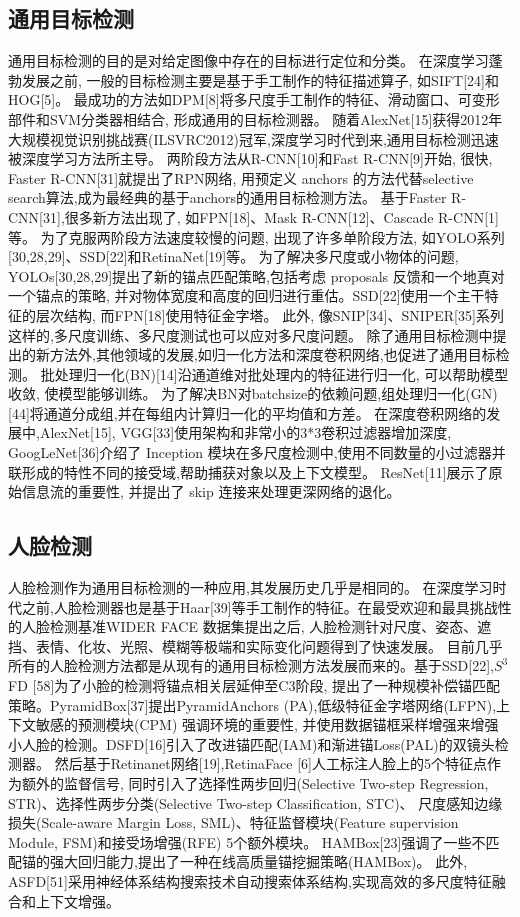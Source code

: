 \documentclass[twocolumn,10pt,a4paper]{article}%
\begin{document}
	\subsection{通用目标检测} 
	通用目标检测的目的是对给定图像中存在的目标进行定位和分类。
	在深度学习蓬勃发展之前, 一般的目标检测主要是基于手工制作的特征描述算子, 如SIFT[24]和HOG[5]。
	最成功的方法如DPM[8]将多尺度手工制作的特征、滑动窗口、可变形部件和SVM分类器相结合, 形成通用的目标检测器。
	随着AlexNet[15]获得2012年大规模视觉识别挑战赛(ILSVRC2012)冠军,深度学习时代到来,通用目标检测迅速被深度学习方法所主导。
	两阶段方法从R-CNN[10]和Fast R-CNN[9]开始,
	很快, Faster R-CNN[31]就提出了RPN网络,
	用预定义 anchors 的方法代替selective search算法,成为最经典的基于anchors的通用目标检测方法。
	基于Faster R-CNN[31],很多新方法出现了, 如FPN[18]、Mask R-CNN[12]、Cascade R-CNN[1]等。
	为了克服两阶段方法速度较慢的问题, 出现了许多单阶段方法, 如YOLO系列[30,28,29]、SSD[22]和RetinaNet[19]等。
	为了解决多尺度或小物体的问题, YOLOs[30,28,29]提出了新的锚点匹配策略,包括考虑 proposals 反馈和一个地真对一个锚点的策略,
	并对物体宽度和高度的回归进行重估。SSD[22]使用一个主干特征的层次结构, 而FPN[18]使用特征金字塔。
	此外, 像SNIP[34]、SNIPER[35]系列这样的,多尺度训练、多尺度测试也可以应对多尺度问题。
	除了通用目标检测中提出的新方法外,其他领域的发展,如归一化方法和深度卷积网络,也促进了通用目标检测。
	批处理归一化(BN)[14]沿通道维对批处理内的特征进行归一化, 可以帮助模型收敛, 使模型能够训练。
	为了解决BN对batchsize的依赖问题,组处理归一化(GN)[44]将通道分成组,并在每组内计算归一化的平均值和方差。
	在深度卷积网络的发展中,AlexNet[15], VGG[33]使用架构和非常小的3*3卷积过滤器增加深度,
	GoogLeNet[36]介绍了 Inception 模块在多尺度检测中,使用不同数量的小过滤器并联形成的特性不同的接受域,帮助捕获对象以及上下文模型。
	ResNet[11]展示了原始信息流的重要性, 并提出了 skip 连接来处理更深网络的退化。
	\subsection{人脸检测}
	人脸检测作为通用目标检测的一种应用,其发展历史几乎是相同的。
	在深度学习时代之前,人脸检测器也是基于Haar[39]等手工制作的特征。在最受欢迎和最具挑战性的人脸检测基准WIDER FACE 数据集提出之后,
	人脸检测针对尺度、姿态、遮挡、表情、化妆、光照、模糊等极端和实际变化问题得到了快速发展。
	目前几乎所有的人脸检测方法都是从现有的通用目标检测方法发展而来的。基于SSD[22],$S^3$FD [58]为了小脸的检测将锚点相关层延伸至C3阶段,
	提出了一种规模补偿锚匹配策略。PyramidBox[37]提出PyramidAnchors (PA),低级特征金字塔网络(LFPN),上下文敏感的预测模块(CPM)
	强调环境的重要性, 并使用数据锚框采样增强来增强小人脸的检测。DSFD[16]引入了改进锚匹配(IAM)和渐进锚Loss(PAL)的双镜头检测器。
	然后基于Retinanet网络[19],RetinaFace [6]人工标注人脸上的5个特征点作为额外的监督信号,
	同时引入了选择性两步回归(Selective Two-step Regression, STR)、选择性两步分类(Selective Two-step Classification, STC)、
	尺度感知边缘损失(Scale-aware Margin Loss, SML)、特征监督模块(Feature supervision Module, FSM)和接受场增强(RFE) 5个额外模块。
	HAMBox[23]强调了一些不匹配锚的强大回归能力,提出了一种在线高质量锚挖掘策略(HAMBox)。
	此外, ASFD[51]采用神经体系结构搜索技术自动搜索体系结构,实现高效的多尺度特征融合和上下文增强。
\end{document}
